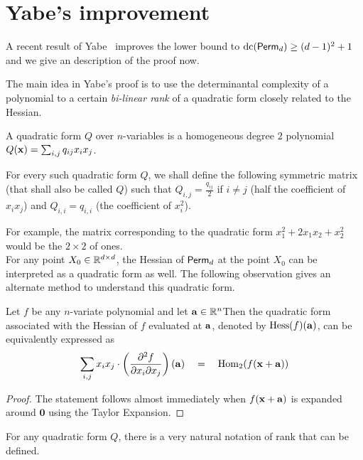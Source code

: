 \section{Yabe's improvement~\cite{Yabe15}}

A recent result of Yabe~\cite{Yabe15} improves the lower bound to $\mathrm{dc}(\mathsf{Perm}_d) \geq (d-1)^2 + 1$ and we give an description of the proof now. 

The main idea in Yabe's proof is to use the determinantal complexity of a polynomial to a certain \emph{bi-linear rank} of a quadratic form closely related to the Hessian. 

\begin{definition}
A quadratic form $Q$ over $n$-variables is a homogeneous degree $2$ polynomial $Q(\mathbf{x}) = \sum_{i,j} q_{ij} x_i x_j$. 

For every such quadratic form $Q$, we shall define the following symmetric matrix (that shall also be called $Q$) such that $Q_{i,j} = \frac{q_{ij}}{2}$ if $i\neq j$ (half the coefficient of $x_i x_j$) and $Q_{i,i} = q_{i,i}$ (the coefficient of $x_i^2$). 
\end{definition}

For example, the matrix corresponding to the quadratic form $x_1^2 + 2x_1x_2 + x_2^2$ would be the $2\times 2$ of ones.\\

For any point $X_0 \in \mathbb{R}^{d\times d}$, the Hessian of $\mathsf{Perm}_d$ at the point $X_0$ can be interpreted as a quadratic form as well. The following observation gives an alternate method to understand this quadratic form. 

\begin{observation}\label{obs:hessian-deg2-hom}
Let $f$ be any $n$-variate polynomial and let $\mathbf{a} \in \mathbb{R}^n$Then the quadratic form associated with the Hessian of $f$ evaluated at $\mathbf{a}$, denoted by $\mathrm{Hess}(f)(\mathbf{a})$, can be equivalently expressed as
\[
\sum_{i,j} x_{i} x_{j} \cdot \left(\frac{\partial^2 f}{\partial x_{i} \partial x_{j}}\right)\left(\mathbf{a}\right) \quad = \quad \mathrm{Hom}_2(f(\mathbf{x} + \mathbf{a}))
\]
\end{observation}
\begin{proof}
The statement follows almost immediately when $f(\mathbf{x} + \mathbf{a})$ is expanded around $\mathbf{0}$ using the Taylor Expansion. 
\end{proof}


\noindent 
For any quadratic form $Q$, there is a very natural notation of rank that can be defined. 


